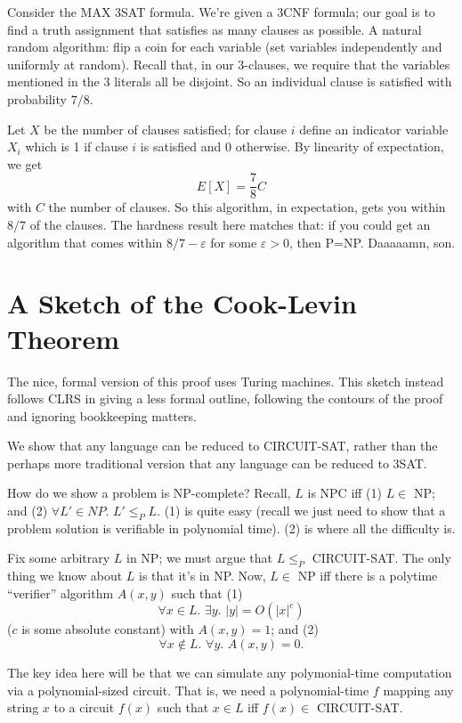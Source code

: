 \documentclass{article}
\begin{document}
Consider the MAX 3SAT formula. We're given a 3CNF formula; our goal is to
find a truth assignment that satisfies as many clauses as possible.
A natural random algorithm: flip a coin for each variable (set variables
independently and uniformly at random).
Recall that, in our 3-clauses, we require that the variables mentioned
in the 3 literals all be disjoint.
So an individual clause is satisfied with probability $7/8$.

Let $X$ be the number of clauses satisfied; for clause $i$ define an 
indicator variable $X_i$ which is 1 if clause $i$ is satisfied and
$0$ otherwise.
By linearity of expectation, we get
$$
E[X] = \frac{7}{8} C
$$
with $C$ the number of clauses.
So this algorithm, in expectation, gets you within $8/7$ of the clauses.
The hardness result here matches that: if you could get an algorithm that
comes within $8/7 - \varepsilon$ for some $\varepsilon > 0$, then P=NP.
Daaaaamn, son.




\section{A Sketch of the Cook-Levin Theorem}

The nice, formal version of this proof uses Turing machines.
This sketch instead follows CLRS in giving a less formal outline, following
the contours of the proof and ignoring bookkeeping matters.

We show that any language can be reduced to CIRCUIT-SAT, rather than the
perhaps more traditional version that any language can be reduced to 3SAT.

How do we show a problem is NP-complete? Recall, 
$L$ is NPC iff (1) $L\in $ NP; and (2) $\forall L'\in NP.\,\, L'\leq_P L$.
(1) is quite easy (recall we just need to show that a problem solution is
verifiable in polynomial time). (2) is where all the difficulty is.

Fix some arbitrary $L$ in NP; we must argue that $L \leq_P$ CIRCUIT-SAT.
The only thing we know about $L$ is that it's in NP. Now, $L\in$ NP
iff there is a polytime ``verifier'' algorithm $A(x,y)$ such that 
(1) 
$$
\forall x\in L.\,\, \exists y.\,\,
|y| = O(|x|^c)
$$
($c$ is some absolute constant) with $A(x,y) = 1$; and (2)
$$
\forall x\not\in L.\,\,
\forall y.\,\,
A(x,y) = 0.
$$

The key idea here will be that we can simulate any polymonial-time computation
via a polynomial-sized circuit.
That is, we need a polynomial-time $f$ mapping any string $x$ to
a circuit $f(x)$ such that $x\in L$ iff $f(x)\in$ CIRCUIT-SAT.
\end{document}
